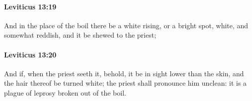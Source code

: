 		\paragraph{Leviticus 13:19} %
			\label{LEVITICUS-13-19}

			And in the place of the boil there be a white rising, or a bright spot, white, and somewhat reddish, and it be shewed to the priest;


		\paragraph{Leviticus 13:20} %
			\label{LEVITICUS-13-20}

			And if, when the priest seeth it, behold, it be in sight lower than the skin, and the hair thereof be turned white; the priest shall pronounce him unclean: it is a plague of leprosy broken out of the boil.



